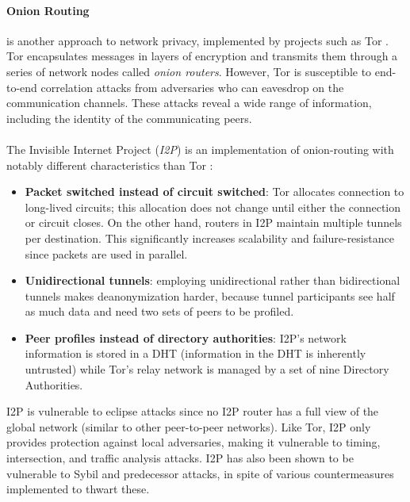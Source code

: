 \paragraph{Onion Routing} is another approach to network
privacy, implemented by projects such as Tor \cite{tor}. Tor encapsulates messages in layers of
encryption and transmits them through a series of network nodes called
\textit{onion routers}. However, Tor is susceptible to end-to-end correlation attacks from adversaries who can eavesdrop on the communication channels. These attacks reveal a wide range of information, including the identity of the communicating peers.
\\~\\The Invisible Internet Project (\textit{I2P}) is an implementation
of onion-routing with notably different characteristics than Tor \cite{i2p}:

\begin{itemize}

    \item \textbf{Packet switched instead of circuit switched}: Tor allocates connection
        to long-lived circuits; this allocation does not change until either the
        connection or circuit closes. On the other hand, routers in I2P maintain
        multiple tunnels per destination. This significantly increases
        scalability and failure-resistance since packets are used in
        parallel.

    \item \textbf{Unidirectional tunnels}: employing unidirectional rather than bidirectional tunnels makes
        deanonymization harder, because tunnel participants see half as much data
        and need two sets of peers to be profiled.

    \item \textbf{Peer profiles instead of directory authorities}: I2P’s network
        information is stored in a DHT (information in the DHT is inherently
        untrusted) while Tor’s relay network is managed by a set of nine
        Directory Authorities.

\end{itemize}
I2P is vulnerable to eclipse attacks since no I2P router has a full view of the
global network (similar to other peer-to-peer networks). Like Tor, I2P only provides protection
against local adversaries, making it vulnerable to timing,
intersection, and traffic analysis attacks. I2P has also been shown to be vulnerable
to Sybil and predecessor attacks, in spite of various countermeasures
implemented to thwart these.

